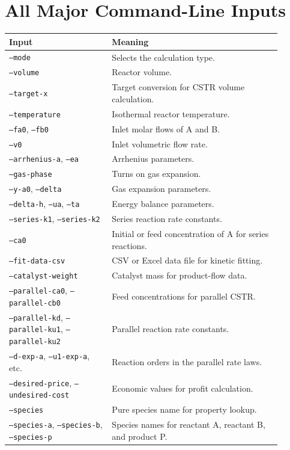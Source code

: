 \documentclass[11pt]{article}
\begin{document}
\section{All Major Command-Line Inputs}

\begin{center}
\begin{tabular}{p{0.34\linewidth} p{0.56\linewidth}}
\toprule
\textbf{Input} & \textbf{Meaning} \\
\midrule
\texttt{--mode} & Selects the calculation type. \\
\texttt{--volume} & Reactor volume. \\
\texttt{--target-x} & Target conversion for CSTR volume calculation. \\
\texttt{--temperature} & Isothermal reactor temperature. \\
\texttt{--fa0}, \texttt{--fb0} & Inlet molar flows of A and B. \\
\texttt{--v0} & Inlet volumetric flow rate. \\
\texttt{--arrhenius-a}, \texttt{--ea} & Arrhenius parameters. \\
\texttt{--gas-phase} & Turns on gas expansion. \\
\texttt{--y-a0}, \texttt{--delta} & Gas expansion parameters. \\
\texttt{--delta-h}, \texttt{--ua}, \texttt{--ta} & Energy balance parameters. \\
\texttt{--series-k1}, \texttt{--series-k2} & Series reaction rate constants. \\
\texttt{--ca0} & Initial or feed concentration of A for series reactions. \\
\texttt{--fit-data-csv} & CSV or Excel data file for kinetic fitting. \\
\texttt{--catalyst-weight} & Catalyst mass for product-flow data. \\
\texttt{--parallel-ca0}, \texttt{--parallel-cb0} & Feed concentrations for parallel CSTR. \\
\texttt{--parallel-kd}, \texttt{--parallel-ku1}, \texttt{--parallel-ku2} & Parallel reaction rate constants. \\
\texttt{--d-exp-a}, \texttt{--u1-exp-a}, etc. & Reaction orders in the parallel rate laws. \\
\texttt{--desired-price}, \texttt{--undesired-cost} & Economic values for profit calculation. \\
\texttt{--species} & Pure species name for property lookup. \\
\texttt{--species-a}, \texttt{--species-b}, \texttt{--species-p} & Species names for reactant A, reactant B, and product P. \\

\end{tabular}
\end{center}
\end{document}
